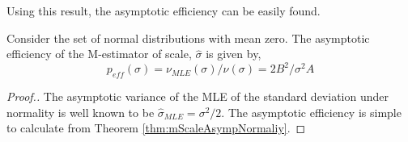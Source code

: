 \noindent Using this result, the asymptotic efficiency can be easily found.
\begin{thm}
Consider the set of normal distributions with mean zero. The asymptotic efficiency of the M-estimator of scale, $\hat\sigma$ is given by,
$$ p_{eff}(\sigma) = \nu_{MLE}(\sigma)/\nu(\sigma) = 2B^2/\sigma^2A $$
\end{thm}
\begin{proof}[Proof.]
The asymptotic variance of the MLE of the standard deviation under normality is well known to be $\hat\sigma_{MLE} = \sigma^2/2$. The asymptotic efficiency is simple to calculate from Theorem \ref{thm:mScaleAsympNormaliy}.
\end{proof}